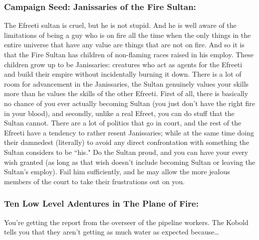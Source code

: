 \subsubsection{Campaign Seed: Janissaries of the Fire Sultan:} The Efreeti sultan is cruel, but he is not stupid. And he is well aware of the limitations of being a guy who is on fire all the time when the only things in the entire universe that have any value are things that are not on fire. And so it is that the Fire Sultan has children of non-flaming races raised in his employ. These children grow up to be Janissaries: creatures who act as agents for the Efreeti and build their empire without incidentally burning it down. There is a lot of room for advancement in the Janissaries, the Sultan genuinely values your skills more than he values the skills of the other Efreeti. First of all, there is basically no chance of you ever actually becoming Sultan (you just don't have the right fire in your blood), and secondly, unlike a real Efreet, you can do stuff that the Sultan cannot. There are a lot of politics that go in court, and the rest of the Efreeti have a tendency to rather resent Janissaries; while at the same time doing their damnedest (literally) to avoid any direct confrontation with something the Sultan considers to be ``his." Do the Sultan proud, and you can have your every wish granted (as long as that wish doesn't include becoming Sultan or leaving the Sultan's employ). Fail him sufficiently, and he may allow the more jealous members of the court to take their frustrations out on you.

\subsubsection{Ten Low Level Adentures in The Plane of Fire:}

You're getting the report from the overseer of the pipeline workers. The Kobold tells you that they aren't getting as much water as expected because\ldots

